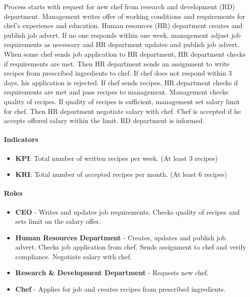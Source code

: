 \documentclass[11pt,a4paper]{article}
\begin{document}
Process starts with request for new chef from research and development (RD) department. Management writes offer of working conditions and requirements for chef's experience and education. Human resources (HR) department creates and publish job advert. If no one responds within one week, management adjust job requirements as necessary and HR department updates and publish job advert. When some chef sends job application to HR department, HR department checks if requirements are met. Then HR department sends an assignment to write recipes from prescribed ingredients to chef. If chef does not respond within 3 days, his application is rejected. If chef sends recipes, HR department checks if requirements are met and pass recipes to management. Management checks quality of recipes. If quality of recipes is sufficient, management set salary limit for chef. Then HR department negotiate salary with chef. Chef is accepted if he accepts offered salary within the limit. RD department is informed.

\paragraph{Indicators}

\begin{itemize}
    \item \textbf{KPI}: Total number of written recipes per week. (At least 3 recipes)
    \item \textbf{KRI}: Total number of accepted recipes per month. (At least 6 recipes)
\end{itemize}

\paragraph{Roles}

\begin{itemize}
    \item \textbf{CEO} - Writes and updates job requirements. Checks quality of recipes and sets limit on the salary offer.
    \item \textbf{Human Resources Department} - Creates, updates and publish job advert. Checks job application from chef. Sends assignment to chef and verify compliance. Negotiate salary with chef.
    \item \textbf{Research \& Development Department} - Requests new chef.
    \item \textbf{Chef} - Applies for job and creates recipes from prescribed ingredients.
\end{itemize}
\end{document}
